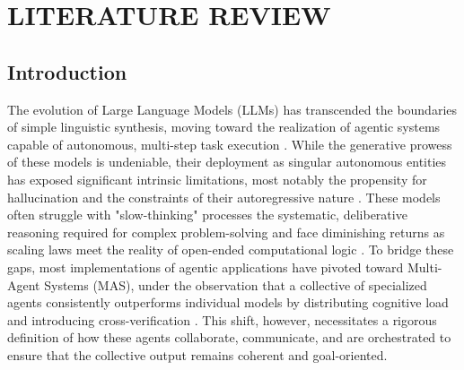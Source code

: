 
\chapter{LITERATURE REVIEW} %

\section{Introduction}

The evolution of Large Language Models (LLMs) has transcended the boundaries of simple linguistic synthesis, moving toward the realization of agentic systems capable of autonomous, multi-step task execution \citep{Jian_2025}. While the generative prowess of these models is undeniable, their deployment as singular autonomous entities has exposed significant intrinsic limitations, most notably the propensity for hallucination and the constraints of their autoregressive nature \citep{tran2025multiagentcollaborationmechanismssurvey}. These models often struggle with "slow-thinking" processes \citep{hagendorff2023human} the systematic, deliberative reasoning required for complex problem-solving and face diminishing returns as scaling laws meet the reality of open-ended computational logic \citep{kaplan2020scaling}. To bridge these gaps, most implementations of agentic applications have pivoted toward Multi-Agent Systems (MAS), under the observation that a collective of specialized agents consistently outperforms individual models by distributing cognitive load and introducing cross-verification \citep{albada2025chapter}. This shift, however, necessitates a rigorous definition of how these agents collaborate, communicate, and are orchestrated to ensure that the collective output remains coherent and goal-oriented.

